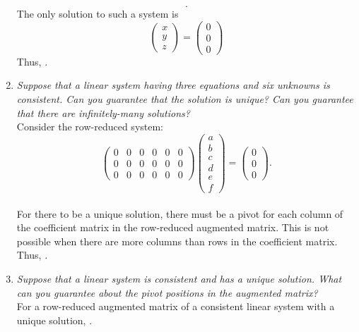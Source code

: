 \documentclass[12pt]{article}
\begin{document}
\begin{enumerate}[label=(\alph*)]
\begin{equation*}
		.
	\end{equation*}
	The only solution to such a system is
	\begin{equation*}
		\begin{pmatrix} x \\ y \\ z \end{pmatrix}
		=
		\begin{pmatrix} 0 \\ 0 \\ 0 \end{pmatrix}
	\end{equation*}
	Thus, .
	\newpage
	\item \textit{Suppose that a linear system having three equations and six
	unknowns is consistent.
	Can you guarantee that the solution is unique?
	Can you guarantee that there are infinitely-many solutions?}
	\\[\baselineskip]
	Consider the row-reduced system:
	\begin{equation*}
		\begin{pmatrix}
			0 & 0 & 0 & 0 & 0 & 0 \\
			0 & 0 & 0 & 0 & 0 & 0 \\
			0 & 0 & 0 & 0 & 0 & 0
		\end{pmatrix}
		\begin{pmatrix} a \\ b \\ c \\ d \\ e \\ f \end{pmatrix}
		=
		\begin{pmatrix} 0 \\ 0 \\ 0 \end{pmatrix}
		.
	\end{equation*}
	\\[\baselineskip]
	For there to be a unique solution, there must be a pivot for each column
	of the coefficient matrix in the row-reduced augmented matrix. This is not
	possible when there are more columns than rows in the coefficient matrix.
	Thus, .
	\item \textit{Suppose that a linear system is consistent and has a unique
	solution.
	What can you guarantee about the pivot positions in the augmented matrix?}
	\\[\baselineskip]
	For a row-reduced augmented matrix of a consistent linear system with a
	unique solution, .
\end{enumerate}
\end{document}
